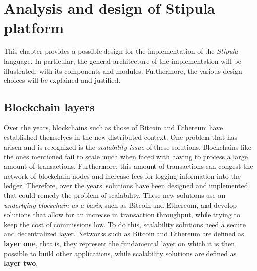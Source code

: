 
\chapter{Analysis and design of Stipula platform}
\label{cap:general-design}

This chapter provides a possible design for the implementation of the \textit{Stipula} language. In 
particular, the general architecture of the implementation will be illustrated, with its components and 
modules. Furthermore, the various design choices will be explained and justified.

\section{Blockchain layers}
\label{blockchain-layers}

Over the years, blockchains such as those of Bitcoin and Ethereum have established themselves in the new 
distributed context. One problem that has arisen and is recognized is the \textit{scalability issue} of 
these solutions. Blockchains like the ones mentioned fail to scale much when faced with having to process a 
large amount of transactions. Furthermore, this amount of transactions can congest the network of 
blockchain nodes and increase fees for logging information into the ledger. Therefore, over the years, 
solutions have been designed and implemented that could remedy the problem of scalability. These new 
solutions use an \textit{underlying blockchain as a basis}, such as Bitcoin and Ethereum, and develop 
solutions that allow for an increase in transaction throughput, while trying to keep the cost of 
commissions low. To do this, scalability solutions need a secure and decentralized layer. Networks such as 
Bitcoin and Ethereum are defined as \textbf{layer one}, that is, they represent the fundamental layer on 
which it is then possible to build other applications, while scalability solutions are defined as 
\textbf{layer two}.

